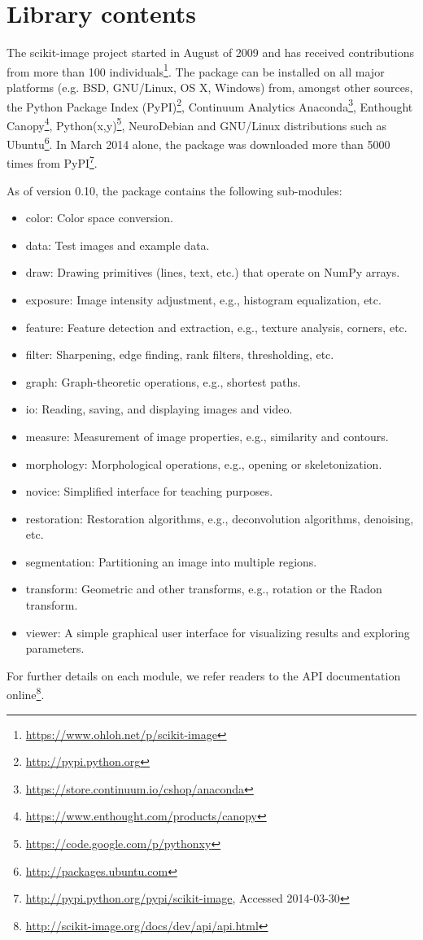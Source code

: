 
\section*{Library contents}
  \label{library-contents}

  The scikit-image project started in August of 2009 and has received contributions from more than 100 individuals\footnote{\url{https://www.ohloh.net/p/scikit-image}}.  The package can be installed on all major platforms (e.g. BSD, GNU/Linux, OS X, Windows) from, amongst other sources, the Python Package Index (PyPI)\footnote{\url{http://pypi.python.org}}, Continuum Analytics Anaconda\footnote{\url{https://store.continuum.io/cshop/anaconda}}, Enthought Canopy\footnote{\url{https://www.enthought.com/products/canopy}}, Python(x,y)\footnote{\url{https://code.google.com/p/pythonxy}}, NeuroDebian \citep{neurodebian} and GNU/Linux distributions such as Ubuntu\footnote{\url{http://packages.ubuntu.com}}. In March 2014 alone, the package was downloaded more than 5000 times from PyPI\footnote{\url{http://pypi.python.org/pypi/scikit-image}, Accessed 2014-03-30}.

  As of version 0.10, the package contains the following sub-modules:

  \begin{itemize}

    \item color: Color space conversion.
    \item data: Test images and example data.
    \item draw: Drawing primitives (lines, text, etc.) that operate on NumPy arrays.
    \item exposure: Image intensity adjustment, e.g., histogram equalization, etc.
    \item feature: Feature detection and extraction, e.g., texture analysis, corners, etc.
    \item filter: Sharpening, edge finding, rank filters, thresholding, etc.
    \item graph: Graph-theoretic operations, e.g., shortest paths.
    \item io: Reading, saving, and displaying images and video.
    \item measure: Measurement of image properties, e.g., similarity and contours.
    \item morphology: Morphological operations, e.g., opening or skeletonization.
    \item novice: Simplified interface for teaching purposes.
    \item restoration: Restoration algorithms, e.g., deconvolution algorithms, denoising, etc.
    \item segmentation: Partitioning an image into multiple regions.
    \item transform: Geometric and other transforms, e.g., rotation or the Radon transform.
    \item viewer: A simple graphical user interface for visualizing results and exploring parameters.

  \end{itemize}

  For further details on each module, we refer readers to the API documentation
  online\footnote{\url{http://scikit-image.org/docs/dev/api/api.html}}.

